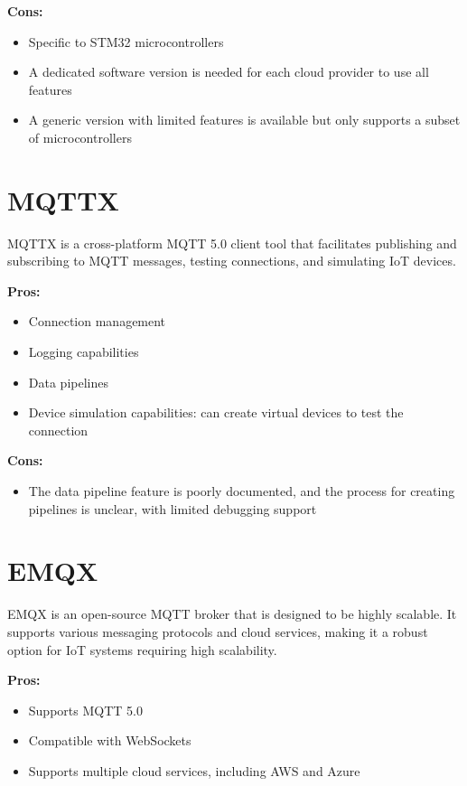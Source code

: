 \textbf{Cons:}
\begin{itemize}
    \item Specific to STM32 microcontrollers
    \item A dedicated software version is needed for each cloud provider to use all features
    \item A generic version with limited features is available but only supports a subset of microcontrollers
\end{itemize}

\section{MQTTX}
\label{mqttx}
MQTTX\cite{site:mqttx} is a cross-platform MQTT 5.0 client tool that facilitates publishing and subscribing to MQTT messages, testing connections, and simulating IoT devices.

\textbf{Pros:}
\begin{itemize}
    \item Connection management
    \item Logging capabilities
    \item Data pipelines
    \item Device simulation capabilities: can create virtual devices to test the connection
\end{itemize}

\textbf{Cons:}
\begin{itemize}
    \item The data pipeline feature is poorly documented, and the process for creating pipelines is unclear, with limited debugging support
\end{itemize}

\section{EMQX}
\label{emqx}
EMQX\cite{site:emqx} is an open-source MQTT broker that is designed to be highly scalable. It supports various messaging protocols and cloud services, making it a robust option for IoT systems requiring high scalability.

\textbf{Pros:}
\begin{itemize}
    \item Supports MQTT 5.0
    \item Compatible with WebSockets
    \item Supports multiple cloud services, including AWS and Azure
\end{itemize}

